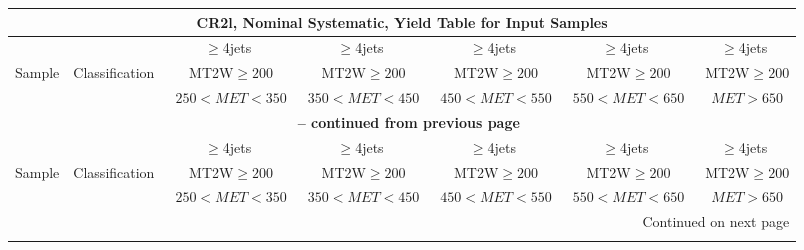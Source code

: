 \documentclass{article}
\begin{document}
 
 
 
 
\pagebreak 

 
 
 
 
\begin{longtable}{|l|c|c|c|c|c|c|} 
 
\multicolumn{7}{c}{ CR2l, Nominal Systematic, Yield Table for Input Samples }\\* \hline 
 &  & $\ge$4jets  & $\ge$4jets  & $\ge$4jets  & $\ge$4jets  & $\ge$4jets \\* 
Sample & Classification  & ~MT2W$\ge200$  & ~MT2W$\ge200$  & ~MT2W$\ge200$  & ~MT2W$\ge200$  & ~MT2W$\ge200$ \\* 
 &  & ~$250<MET<350$  & ~$350<MET<450$  & ~$450<MET<550$  & ~$550<MET<650$  & ~$MET>650$ \\* 
\hline \hline 
\endfirsthead 
 
\multicolumn{7}{c}{{\bfseries \tablename\ \thetable{} -- continued from previous page}}\\* \hline 
 &  & $\ge$4jets  & $\ge$4jets  & $\ge$4jets  & $\ge$4jets  & $\ge$4jets \\* 
Sample & Classification  & ~MT2W$\ge200$  & ~MT2W$\ge200$  & ~MT2W$\ge200$  & ~MT2W$\ge200$  & ~MT2W$\ge200$ \\* 
 &  & ~$250<MET<350$  & ~$350<MET<450$  & ~$450<MET<550$  & ~$550<MET<650$  & ~$MET>650$ \\* 
\hline \hline 
\endhead 
 
\multicolumn{7}{|r|}{{Continued on next page}}\\* \hline 
\endfoot 
 
 
\endlastfoot 
 

\end{longtable}
\end{document}
